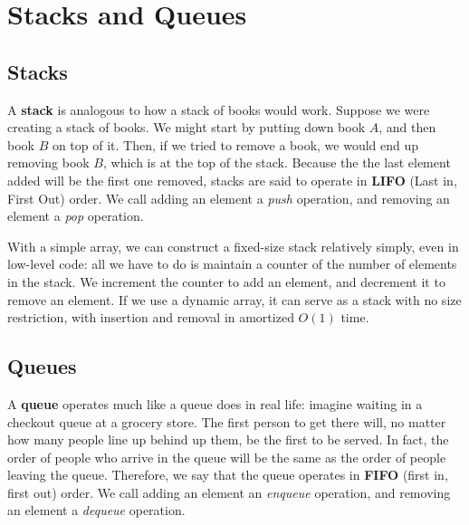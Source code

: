 \section{Stacks and Queues}

\subsection{Stacks}

A \textbf{stack} is analogous to how a stack of books would work. Suppose we were creating a stack of books. We might start by putting down book $A$, and then book $B$ on top of it. Then, if we tried to remove a book, we would end up removing book $B$, which is at the top of the stack. Because the the last element added will be the first one removed, stacks are said to operate in \textbf{LIFO} (Last in, First Out) order. We call adding an element a \textit{push} operation, and removing an element a \textit{pop} operation.

With a simple array, we can construct a fixed-size stack relatively simply, even in low-level code: all we have to do is maintain a counter of the number of elements in the stack. We increment the counter to add an element, and decrement it to remove an element. If we use a dynamic array, it can serve as a stack with no size restriction, with insertion and removal in amortized $O(1)$ time.


\subsection{Queues}

A \textbf{queue} operates much like a queue does in real life: imagine waiting in a checkout queue at a grocery store. The first person to get there will, no matter how many people line up behind up them, be the first to be served. In fact, the order of people who arrive in the queue will be the same as the order of people leaving the queue. Therefore, we say that the queue operates in \textbf{FIFO} (first in, first out) order. We call adding an element an \textit{enqueue} operation, and removing an element a \textit{dequeue} operation.


\begin{comment}
One surprising solution is to use two stacks concurrently.
\begin{algorithm}[H]
\caption{Two-stacks implementation of queue}
\begin{algorithmic}

\State $in_stack \gets$ empty stack
\State $out_stack \gets$ empty stack

\Function{enqueue}{$el$}
    \State \Call{in_stack.push}{$el$}
\EndFunction

\Function{dequeue}{}
    \If{$out_stack$ is empty}
        \While{$in_stack$ is not empty}
            \State $temp \gets$ \Call{in_stack.pop}{}
            \State \Call{out_stack.push}{$temp$}
        \EndWhile
    \EndIf
    \State \Return \Call{out_stack.pop}{}
\EndFunction

\end{algorithmic}
\end{algorithm}
\end{comment}


